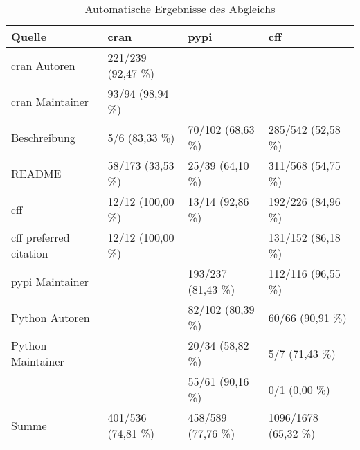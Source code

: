 \begin{table}[H]
    \footnotesize
    \centering
    \begin{tabularx}{\textwidth}{XR{3.2cm}R{3.2cm}R{3.2cm}}
        \toprule
        \textbf{Quelle}              & \textbf{\gls{cran}} & \textbf{\gls{pypi}} & \textbf{\gls{cff}}   \\ \midrule
        \gls{cran} Autoren           & 221/239 (92,47 \%)  &                     &                      \\
        \gls{cran} Maintainer        & 93/94 (98,94 \%)    &                     &                      \\
        Beschreibung                 & 5/6 (83,33 \%)      & 70/102 (68,63 \%)   & 285/542 (52,58 \%)   \\
        README                       & 58/173 (33,53 \%)   & 25/39 (64,10 \%)    & 311/568 (54,75 \%)   \\
        \gls{cff}                    & 12/12 (100,00 \%)   & 13/14 (92,86 \%)    & 192/226 (84,96 \%)   \\
        \gls{cff} preferred citation & 12/12 (100,00 \%)   &                     & 131/152 (86,18 \%)   \\
        \gls{pypi} Maintainer        &                     & 193/237 (81,43 \%)  & 112/116 (96,55 \%)   \\
        Python Autoren               &                     & 82/102 (80,39 \%)   & 60/66 (90,91 \%)     \\
        Python Maintainer            &                     & 20/34 (58,82 \%)    & 5/7 (71,43 \%)       \\
                      &                     & 55/61 (90,16 \%)    & 0/1 (0,00 \%)        \\ \midrule
        Summe                        & 401/536 (74,81 \%)  & 458/589 (77,76 \%)  & 1096/1678 (65,32 \%) \\
        \bottomrule
    \end{tabularx}
    \caption{Automatische Ergebnisse des Abgleichs}
    \label{tab:matching_results_auto_anhang}
\end{table}


